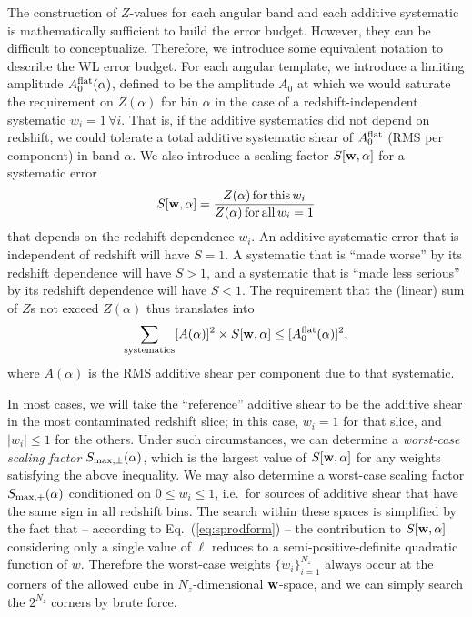 \documentclass[aps,prd, amsmath,amssymb,superscriptaddress,showkeys,nofootinbib,reprint,preprintnumbers]{revtex4-1}
\begin{document}
\begin{widetext}
The construction of $Z$-values for each angular band and each additive
systematic is mathematically sufficient to build the error
budget. However, they can be difficult to conceptualize. Therefore, we
introduce some equivalent notation to describe the WL error
budget. For each angular template, we introduce a limiting amplitude
$A_0^{\rm flat}(\alpha)$, defined to be the amplitude $A_0$ at which
we would saturate the requirement on $Z(\alpha)$ for bin $\alpha$ in
the case of a redshift-independent systematic $w_i=1\,\forall i$. That
is, if the additive systematics did not depend on redshift, we could
tolerate a total additive systematic shear of $A_0^{\rm flat}$ (RMS
per component) in band $\alpha$. We also introduce a scaling factor
$S[{\bf w},\alpha]$ for a systematic error
\begin{equation}
S[{\bf w},\alpha] = \frac{Z(\alpha) \,{\rm for\,this\,}w_i}{Z(\alpha)\,{\rm for\,all\,}w_i=1}
\end{equation}
that depends on the redshift dependence $w_i$. An additive systematic error that is independent of redshift will have $S=1$. A systematic that is ``made worse'' by its redshift dependence will have $S>1$, and a systematic that is ``made less serious'' by its redshift dependence will have $S<1$. The requirement that the (linear) sum of $Z$s not exceed $Z(\alpha)$ thus translates into
\begin{equation}
\sum_{\rm systematics} [A(\alpha)]^2\times S[{\bf w},\alpha] \le [A_0^{\rm flat}(\alpha)]^2,
\label{eq:A-S-sum}
\end{equation}
where $A(\alpha)$ is the RMS additive shear per component due to that systematic.

In most cases, we will take the ``reference'' additive shear to be the
additive shear in the most contaminated redshift slice; in this case,
$w_i=1$ for that slice, and $|w_i|\le 1$ for the others. Under such
circumstances, we can determine a {\em worst-case scaling factor}
$S_{\rm max,\pm}(\alpha)$, which is the largest value of $S[{\bf
w},\alpha]$ for any weights satisfying the above inequality. We may
also determine a worst-case scaling factor $S_{\rm max,+}(\alpha)$
conditioned on $0\le w_i\le 1$, i.e.\ for sources of additive shear
that have the same sign in all redshift bins. The search within these
spaces is simplified by the fact that -- according to
Eq.~(\ref{eq:sprodform}) -- the contribution to $S[{\bf w},\alpha]$
considering only a single value of $\ell$ reduces to a
semi-positive-definite quadratic function of $w$. Therefore the
worst-case weights $\{w_i\}_{i=1}^{N_z}$ always occur at the corners
of the allowed cube in $N_z$-dimensional ${\bf w}$-space, and we can
simply search the $2^{N_z}$ corners by brute force.


\end{widetext}
\end{document}
